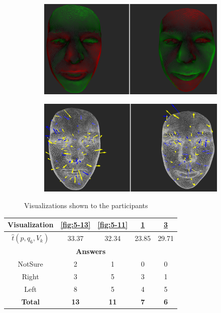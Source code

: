 \begin{figure}[h]
\begin{subfigure}{0.4\textwidth}
\includegraphics[width=\textwidth]{./screenshots/pair12.PNG}
\caption{}
\label{fig:5-12}
\end{subfigure}
\quad
\begin{subfigure}{0.4\textwidth}
\includegraphics[width=\textwidth]{./screenshots/pair14.PNG}
\caption{}
\label{fig:5-14}
\end{subfigure}
\caption{Visualizations shown to the participants}
\end{figure}
\medskip

\begin{center}
\begin{tabular}{| c | c | c | c | c |}
	\hline
	Visualization & \ref{fig:5-13} & \ref{fig:5-11} & \ref{fig:5-12} & \ref{fig:5-14}\\ \hline
	\(\widehat{t}(p, q_6, V_k)\) & 33.37 & 32.34 & 23.85 & 29.71\\ \hline
	\multicolumn{5}{|c|}{\bf Answers} \\ \hline
	NotSure & 2 & 1 & 0 & 0\\ \hline
	Right & 3 & 5 & 3 & 1\\ \hline
	Left & 8 & 5 & 4 & 5\\ \hline
	{\bf Total} & {\bf 13} & {\bf 11} & {\bf 7} & {\bf 6}\\ \hline
\end{tabular}
\end{center}
\clearpage

